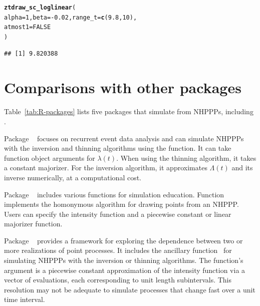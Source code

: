 \documentclass[article]{jss}\usepackage[]{graphicx}\usepackage[]{xcolor}
\makeatletter
\newcommand{\hlnum}[1]{\textcolor[rgb]{0.686,0.059,0.569}{#1}}%
\newcommand{\hlopt}[1]{\textcolor[rgb]{0,0,0}{#1}}%
\newcommand{\hlstd}[1]{\textcolor[rgb]{0.345,0.345,0.345}{#1}}%
\newcommand{\hlkwc}[1]{\textcolor[rgb]{0.333,0.667,0.333}{#1}}%
\newcommand{\hlkwd}[1]{\textcolor[rgb]{0.737,0.353,0.396}{\textbf{#1}}}%
\newenvironment{kframe}{%
 \def\at@end@of@kframe{}%
 \ifinner\ifhmode%
  \def\at@end@of@kframe{\end{minipage}}%
  \begin{minipage}{\columnwidth}%
 \fi\fi%
 \def\FrameCommand##1{\hskip\@totalleftmargin \hskip-\fboxsep
 \colorbox{shadecolor}{##1}\hskip-\fboxsep
     \hskip-\linewidth \hskip-\@totalleftmargin \hskip\columnwidth}%
 \MakeFramed {\advance\hsize-\width
   \@totalleftmargin\z@ \linewidth\hsize
   \@setminipage}}%
 {\par\unskip\endMakeFramed%
 \at@end@of@kframe}
\newenvironment{knitrout}{}{} %
\newcommand{\fct}[1]{\code{#1()}}
\makeatother
\begin{document}
\begin{knitrout}
\color{fgcolor}\begin{kframe}
\begin{alltt}
\hlkwd{ztdraw_sc_loglinear}\hlstd{(}
  \hlkwc{alpha} \hlstd{=} \hlnum{1}\hlstd{,} \hlkwc{beta} \hlstd{=} \hlopt{-}\hlnum{0.02}\hlstd{,} \hlkwc{range_t} \hlstd{=} \hlkwd{c}\hlstd{(}\hlnum{9.8}\hlstd{,} \hlnum{10}\hlstd{),}
  \hlkwc{atmost1} \hlstd{=} \hlnum{FALSE}
\hlstd{)}
\end{alltt}
\begin{verbatim}
## [1] 9.820388
\end{verbatim}
\end{kframe}
\end{knitrout}


\section[Comparisons with other R packages]{Comparisons with other  packages}\label{sec:other-R-packages}

Table~\ref{tab:R-packages} lists five  packages that simulate from NHPPPs, including .

Package ~\citep{reda-package} focuses on recurrent event data analysis and can simulate NHPPPs with the inversion and thinning algorithms using the \fct{simEvent} function. It can take function object arguments for $\lambda(t)$. When using the thinning algorithm, it takes a constant majorizer. For the inversion algorithm, it approximates $\Lambda(t)$ and its inverse numerically, at a computational cost.

Package ~\citep{simEd-package} includes various functions for simulation education. Function \fct{thinning} implements the homonymous algorithm for drawing points from an NHPPP. Users can specify the intensity function and a piecewise constant or linear majorizer function.

Package ~\citep{IndTestPP-package} provides a framework for exploring the dependence between two or more realizations of point processes. It includes the ancillary function~\fct{simNHPc} for simulating NHPPPs with the inversion or thinning algorithms. The function's argument is a piecewise constant approximation of the intensity function via a vector of evaluations, each corresponding to unit length subintervals. This resolution may not be adequate to simulate processes that change fast over a unit time interval.
\end{document}
